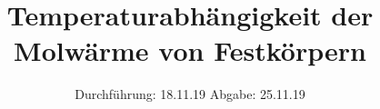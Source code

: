 
\setlength{\parindent}{0 pt}

\subject{V47}
\title{Temperaturabhängigkeit der Molwärme von Festkörpern}
\date{%
  Durchführung: 18.11.19
  \hspace{3em}
  Abgabe: 25.11.19
}



\maketitle
\thispagestyle{empty}
\tableofcontents
\newpage






\printbibliography{}


